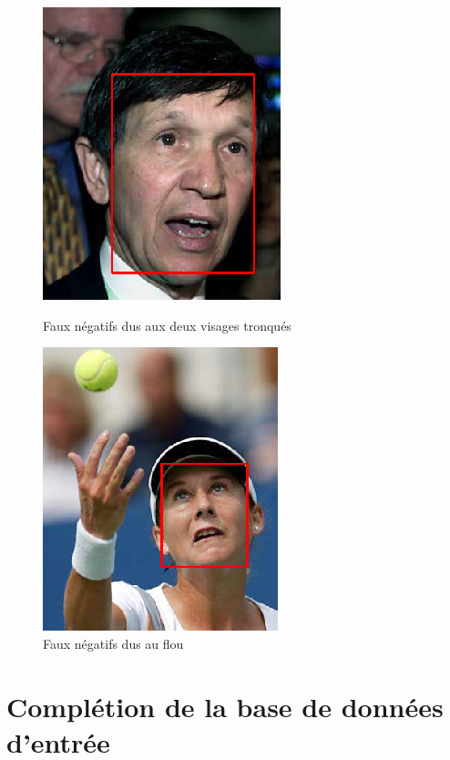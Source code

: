 \documentclass[a4paper,11pt]{article}
\begin{document}
\begin{figure}[H]
    \centering
    \begin{minipage}[c]{0.45\linewidth}
        \begin{center}
            \includegraphics[scale=0.505]{facenetFN3.png}
            \caption{Faux négatifs dus aux deux visages tronqués}
        \end{center}
    \end{minipage} \hfill
    \begin{minipage}[c]{0.45\linewidth}
        \begin{center}
            \includegraphics[scale=0.52]{facenetFN4.png}
            \caption{Faux négatifs dus au flou}
        \end{center}
    \end{minipage}
\end{figure}

\section{Complétion de la base de données d'entrée}
\label{sec:completion}
    
\end{document}
